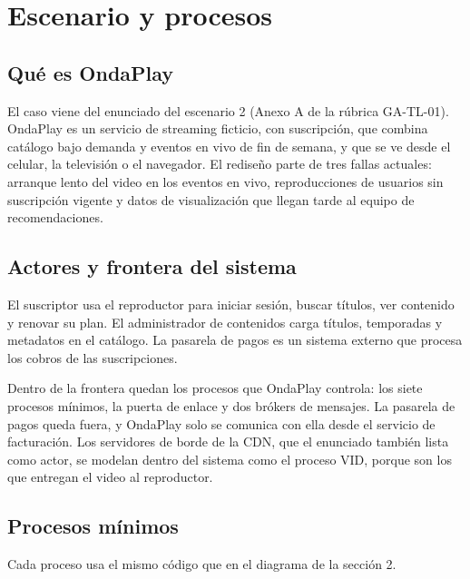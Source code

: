 \section{Escenario y procesos}
\label{sec:escenario}

\subsection{Qué es OndaPlay}

El caso viene del enunciado del escenario 2 (Anexo A de la rúbrica
GA-TL-01). OndaPlay es un servicio de streaming ficticio, con
suscripción, que combina catálogo bajo demanda y eventos en vivo de
fin de semana, y que se ve desde el celular, la televisión o el
navegador. El rediseño parte de tres fallas actuales: arranque lento
del video en los eventos en vivo, reproducciones de usuarios sin
suscripción vigente y datos de visualización que llegan tarde al
equipo de recomendaciones.

\subsection{Actores y frontera del sistema}

El suscriptor usa el reproductor para iniciar sesión, buscar títulos,
ver contenido y renovar su plan. El administrador de contenidos carga
títulos, temporadas y metadatos en el catálogo. La pasarela de pagos
es un sistema externo que procesa los cobros de las suscripciones.

Dentro de la frontera quedan los procesos que OndaPlay controla: los
siete procesos mínimos, la puerta de enlace y dos brókers de mensajes.
La pasarela de pagos queda fuera, y OndaPlay solo se comunica con ella
desde el servicio de facturación. Los servidores de borde de la CDN,
que el enunciado también lista como actor, se modelan dentro del sistema
como el proceso VID, porque son los que entregan el video al
reproductor.

\subsection{Procesos mínimos}

Cada proceso usa el mismo código que en el diagrama de la sección 2.

